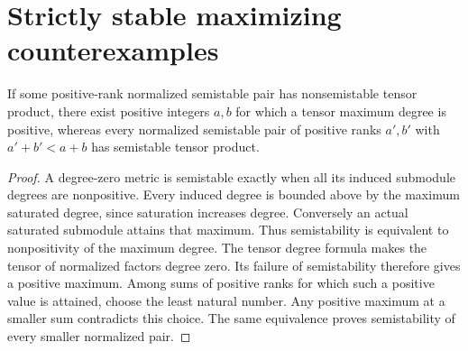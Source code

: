 \chapter{Strictly stable maximizing counterexamples}

\begin{lemma}
\label{lem:minimal-counterexample-rank-sum}
\leanok
If some positive-rank normalized semistable pair has nonsemistable
tensor product, there exist positive integers $a,b$ for which a tensor
maximum degree is positive, whereas every normalized semistable pair
of positive ranks $a',b'$ with $a'+b'<a+b$ has semistable tensor product.
\end{lemma}
\begin{proof}
A degree-zero metric is semistable exactly when all its induced
submodule degrees are nonpositive. Every induced degree is bounded
above by the maximum saturated degree, since saturation increases
degree. Conversely an actual saturated submodule attains that maximum.
Thus semistability is equivalent to nonpositivity of the maximum degree.
The tensor degree formula makes the tensor of normalized factors
degree zero. Its failure of semistability therefore gives a positive
maximum. Among sums of positive ranks for which such a positive value
is attained, choose the least natural number. Any positive maximum at
a smaller sum contradicts this choice. The same equivalence proves
semistability of every smaller normalized pair.
\end{proof}

